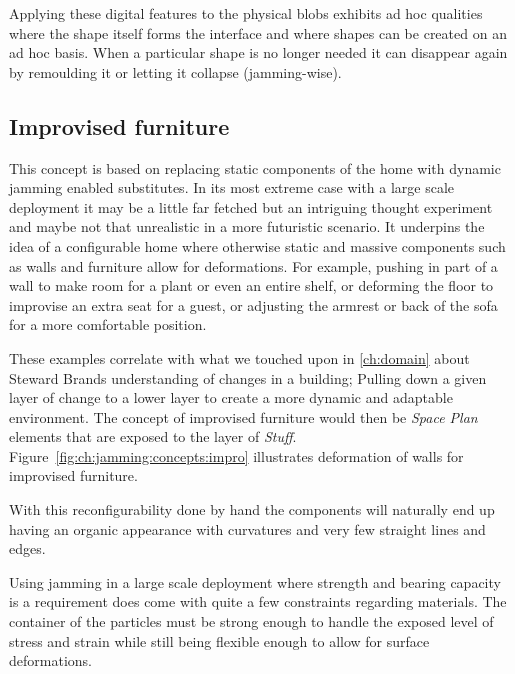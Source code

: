 Applying these digital features to the physical blobs exhibits ad hoc qualities where the shape itself forms the interface and where shapes can be created on an ad hoc basis.
When a particular shape is no longer needed it can disappear again by remoulding it or letting it collapse (jamming-wise).

\subsection{Improvised furniture}
\label{ch:jamming:concepts:improvised_furniture}

This concept is based on replacing static components of the home with dynamic jamming enabled substitutes.
In its most extreme case with a large scale deployment it may be a little far fetched but an intriguing thought experiment and maybe not that unrealistic in a more futuristic scenario.
It underpins the idea of a configurable home where otherwise static and massive components such as walls and furniture allow for deformations.
For example, pushing in part of a wall to make room for a plant or even an entire shelf, or deforming the floor to improvise an extra seat for a guest, or adjusting the armrest or back of the sofa for a more comfortable position.

These examples correlate with what we touched upon in \autoref{ch:domain} about Steward Brands understanding of changes in a building;
Pulling down a given layer of change to a lower layer to create a more dynamic and adaptable environment.
The concept of improvised furniture would then be \emph{Space Plan} elements that are exposed to the layer of \emph{Stuff}. 
Figure~\ref{fig:ch:jamming:concepts:impro} illustrates deformation of walls for improvised furniture.

With this reconfigurability done by hand the components will naturally end up having an organic appearance with curvatures and very few straight lines and edges.

Using jamming in a large scale deployment where strength and bearing capacity is a requirement does come with quite a few constraints regarding materials.
The container of the particles must be strong enough to handle the exposed level of stress and strain while still being flexible enough to allow for surface deformations.

